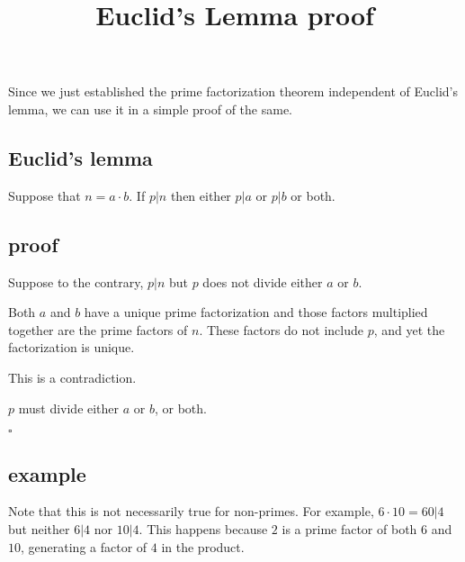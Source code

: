 \documentclass[11pt, oneside]{article}
\title{Euclid's Lemma proof}
\date{}
\begin{document}
\maketitle
\Large

Since we just established the prime factorization theorem independent of Euclid’s lemma, we can use it in a simple proof of the same.

\subsection*{Euclid's lemma}

Suppose that $n = a \cdot b$. If $p|n$ then either $p|a$ or $p|b$ or both.

\subsection*{proof}

Suppose to the contrary, $p|n$ but $p$ does not divide either $a$ or $b$.

Both $a$ and $b$ have a unique prime factorization and those factors multiplied together are the prime factors of $n$. These factors do not include $p$, and yet the factorization is unique. 

This is a contradiction.

$p$ must divide either $a$ or $b$, or both.

$\square$

\subsection*{example}

Note that this is not necessarily true for non-primes.  For example, $6 \cdot 10 = 60 | 4$ but neither $6 | 4$ nor $10 | 4$.  This happens because $2$ is a prime factor of both $6$ and $10$, generating a factor of $4$ in the product.
\end{document}
